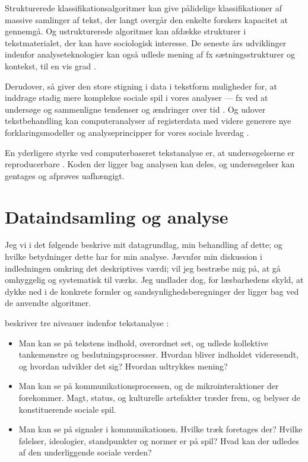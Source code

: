 Strukturerede klassifikationsalgoritmer kan give pålidelige klassifikationer af massive samlinger af tekst, der langt overgår den enkelte forskers kapacitet at gennemgå.
Og ustrukturerede algoritmer kan afdække strukturer i tekstmaterialet, der kan have sociologisk interesse.
De seneste års udviklinger indenfor analyseteknologier kan også udlede mening af fx sætningsstrukturer og kontekst, til en vis grad
\autocite[s. 22]{evansMachineTranslationMining2016}.

Derudover, så giver den store stigning i data i tekstform muligheder for, at inddrage stadig mere komplekse sociale spil i vores analyser — fx ved at undersøge og sammenligne tendenser og ændringer over tid \autocite{evansMachineTranslationMining2016}.
Og udover tekstbehandling kan computeranalyser af registerdata med videre generere nye forklaringsmodeller og analyseprincipper for vores sociale hverdag \autocite{evansComputationSociologicalImagination2019}.

En yderligere styrke ved computerbaseret tekstanalyse er, at undersøgelserne er reproducerbare \autocite[s. 13]{kwartlerTextMiningPractice2017}.
Koden der ligger bag analysen kan deles, og undersøgelser kan gentages og afprøves uafhængigt.

\chapter{Dataindsamling og analyse}\label{chap:data}

Jeg vi i det følgende beskrive mit datagrundlag, min behandling af dette; og hvilke betydninger dette har for min analyse.
Jævnfør min diskussion i indledningen omkring det deskriptives værdi; vil jeg bestræbe mig på, at gå omhyggelig og systematisk til værks.
Jeg undlader dog, for læsbarhedens skyld, at dykke ned i de konkrete formler og sandsynlighedsberegninger der ligger bag ved de anvendte algoritmer.

\citeauthor{evansMachineTranslationMining2016} beskriver tre niveauer indenfor tekstanalyse \autocite[s. 34]{evansMachineTranslationMining2016}:
\begin{itemize}
  \item
    Man kan se på tekstens indhold, overordnet set, og udlede kollektive tankemønstre og beslutningsprocesser.
    Hvordan bliver indholdet videresendt, og hvordan udvikler det sig?
    Hvordan udtrykkes mening?
  \item
    Man kan se på kommunikationsprocessen, og de mikrointeraktioner der forekommer.
    Magt, status, og kulturelle artefakter træder frem, og belyser de konstituerende sociale spil.
  \item
    Man kan se på signaler i kommunikationen.
    Hvilke træk foretages der?
    Hvilke følelser, ideologier, standpunkter og normer er på spil?
    Hvad kan der udledes af den underliggende sociale verden?
\end{itemize}

